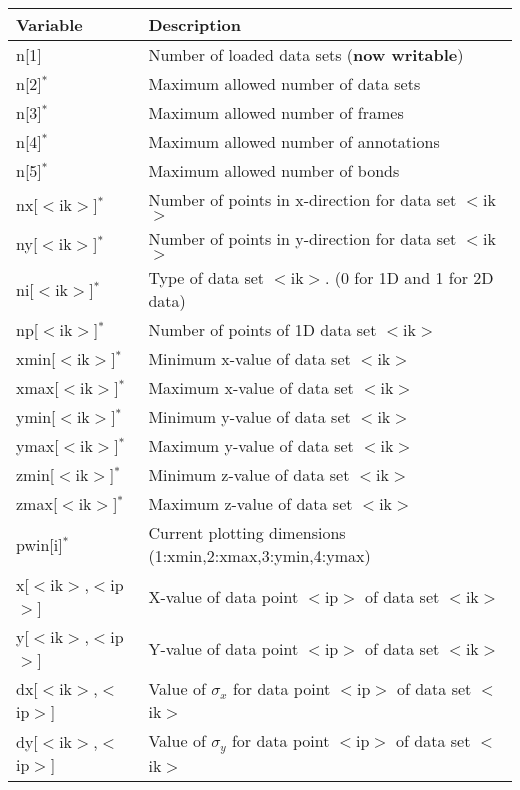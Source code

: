\begin{table}[!tb]
\centering
\begin{tabularx}{\textwidth}{|p{40mm}|X|}
  \hline
  {\bf Variable} & {\bf Description} \\
  \hline \hline
  n[1]               & Number of loaded data sets ({\bf now writable})\\
  n[2]$^{*}$         & Maximum allowed number of data sets \\
  n[3]$^{*}$         & Maximum allowed number of frames \\
  n[4]$^{*}$         & Maximum allowed number of annotations \\
  n[5]$^{*}$         & Maximum allowed number of bonds \\
  \hline
  nx[$<$ik$>$]$^{*}$ & Number of points in x-direction for data set $<$ik$>$ \\
  ny[$<$ik$>$]$^{*}$ & Number of points in y-direction for data set $<$ik$>$ \\
  ni[$<$ik$>$]$^{*}$ & Type of data set $<$ik$>$. (0 for 1D
                       and 1 for 2D data) \\
  np[$<$ik$>$]$^{*}$ & Number of points of 1D data set $<$ik$>$ \\
  \hline
  xmin[$<$ik$>$]$^{*}$ & Minimum x-value of data set $<$ik$>$ \\
  xmax[$<$ik$>$]$^{*}$ & Maximum x-value of data set $<$ik$>$ \\
  ymin[$<$ik$>$]$^{*}$ & Minimum y-value of data set $<$ik$>$ \\
  ymax[$<$ik$>$]$^{*}$ & Maximum y-value of data set $<$ik$>$ \\
  zmin[$<$ik$>$]$^{*}$ & Minimum z-value of data set $<$ik$>$ \\
  zmax[$<$ik$>$]$^{*}$ & Maximum z-value of data set $<$ik$>$ \\
  pwin[i]$^{*}$        & Current plotting dimensions
                         (1:xmin,2:xmax,3:ymin,4:ymax) \\
  \hline
   x[$<$ik$>$,$<$ip$>$] & X-value of data point $<$ip$>$ of data set $<$ik$>$\\
   y[$<$ik$>$,$<$ip$>$] & Y-value of data point $<$ip$>$ of data set $<$ik$>$\\
  dx[$<$ik$>$,$<$ip$>$] & Value of $\sigma_{x}$ for data point $<$ip$>$ of
                          data set $<$ik$>$\\
  dy[$<$ik$>$,$<$ip$>$] & Value of $\sigma_{y}$ for data point $<$ip$>$ of
                          data set $<$ik$>$\\

\end{tabularx}
\end{table}
